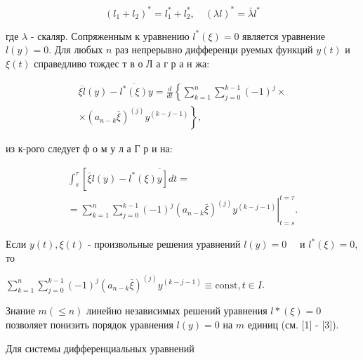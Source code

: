\documentclass[10pt]{article}
\begin{document}
\[

\left(l_{1}+l_{2}\right)^{*}=l_{1}^{*}+l_{2}^{*}, \quad(\lambda l)^{*}=\bar{\lambda} l^{*}

\]



где $\lambda$ - скаляр. Сопряженным к уравнению $l^{*}(\xi)=0$ является уравнение $l(y)=0$. Для любых $n$ раз непрерывно дифференци руемых функций $y(t)$ и $\xi(t)$ справедливо тождес т в о Л а г р а н жа:



\[

\begin{gathered}

\overline{\xi l}(y)-\overline{l^{*}(\xi)} y=\frac{d}{d t}\left\{\sum_{k=1}^{n} \sum_{j=0}^{k-1}(-1)^{j} \times\right. \\

\left.\times\left(a_{n-k} \bar{\xi}\right)^{(j)} y^{(k-j-1)}\right\},

\end{gathered}

\]



из к-рого следует ф о м у л а Г р и на:



\[

\begin{gathered}

\int_{s}^{\tau}\left[\bar{\xi} l(y)-\overline{\left.l^{*}(\xi) y\right] d t=}\right. \\

=\left.\sum_{k=1}^{n} \sum_{j=0}^{k-1}(-1)^{j}\left(a_{n-k} \bar{\xi}\right)^{(j)} y^{(k-j-1)}\right|_{t=s} ^{t=\tau} .

\end{gathered}

\]



Если $y(t), \xi(t)$ - произвольные решения уравнений $l(y)=0 \quad$ и $l^{*}(\xi)=0$, то



$\sum_{k=1}^{n} \sum_{j=0}^{k-1}(-1)^{j}\left(a_{n-k} \bar{\xi}\right)^{(j)} y^{(k-j-1)} \equiv \mathrm{const}, t \in I$.



Знание $m(\leqslant n)$ линейно независимых решений уравнения $l *(\xi)=0$ позволяет понизить порядок уравнения $l(y)=0$ на $m$ единиц (см. [1] - [3]).



Для системы дифференциальных уравнений
\end{document}
